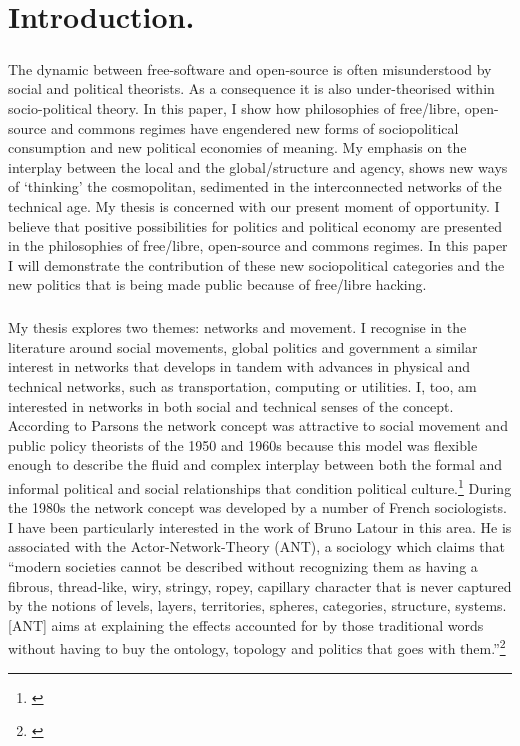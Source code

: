 \chapter{Introduction.}
\paragraph{}The dynamic between free-software and open-source is often misunderstood by social and political theorists. As a consequence it is also under-theorised within socio-political theory. In this paper, I show how philosophies of free/libre, open-source and commons regimes have engendered new forms of sociopolitical consumption and new political economies of meaning. My emphasis on the interplay between the local and the global/structure and agency, shows new ways of `thinking' the cosmopolitan, sedimented in the interconnected networks of the technical age. My thesis is concerned with our present moment of opportunity. I believe that positive possibilities for politics and political economy are presented in the philosophies of free/libre, open-source and commons regimes. In this paper I will demonstrate the contribution of these new sociopolitical categories and the new politics that is being made public because of free/libre hacking.

\paragraph{}My thesis explores two themes: networks and movement. I recognise in the literature around social movements, global politics and government a similar interest in networks that develops in tandem with advances in physical and technical networks, such as transportation, computing or utilities. I, too, am interested in networks in both social and technical senses of the concept. According to Parsons the network concept was attractive to social movement and public policy theorists of the 1950 and 1960s because this model was flexible enough to describe the fluid and complex interplay between both the formal and informal political and social relationships that condition political culture.\footnote{\cite{parsons:1995}} During the 1980s the network concept was developed by a number of French sociologists. I have been particularly interested in the work of Bruno Latour in this area. He is associated with the Actor-Network-Theory (ANT), a sociology which claims that ``modern societies cannot be described without recognizing them as having a fibrous, thread-like, wiry, stringy, ropey, capillary character that is never captured by the notions of levels, layers, territories, spheres, categories, structure, systems. [ANT] aims at explaining the effects accounted for by those traditional words without having to buy the ontology, topology and politics that goes with them.''\footnote{\cite{latour:1998ant1}}


